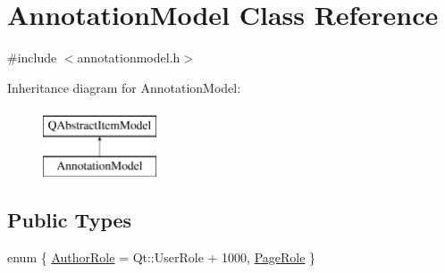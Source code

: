 \hypertarget{classAnnotationModel}{\section{Annotation\+Model Class Reference}
\label{classAnnotationModel}
}


{\ttfamily \#include $<$annotationmodel.\+h$>$}

Inheritance diagram for Annotation\+Model\+:\begin{figure}[H]
\begin{center}
\leavevmode
\includegraphics[height=2.000000cm]{classAnnotationModel}
\end{center}
\end{figure}
\subsection*{Public Types}
\begin{DoxyCompactItemize}
\item 
enum \{ \hyperlink{classAnnotationModel_aa517b64760be429123ee732470e08169ab4fc887a927920384c188f096592e49b}{Author\+Role} = Qt\+:\+:User\+Role + 1000, 
\hyperlink{classAnnotationModel_aa517b64760be429123ee732470e08169a36e01de5a0952a700d4f7cd17491aa57}{Page\+Role}
 \}
\end{DoxyCompactItemize}
